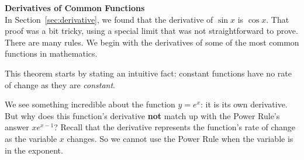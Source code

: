 \noindent\textbf{\large Derivatives of Common Functions}\\

In Section~\ref{sec:derivative}, we found that the derivative of $\sin x$ is $\cos x$.  That proof was a bit tricky, using a special limit that was not straightforward to prove.  There are many rules.  We begin with the derivatives of some of the most common functions in mathematics.\\


This theorem starts by stating an intuitive fact: constant functions have no rate of change as they are \textit{constant}.

We see something incredible about the function $y=e^x$: it is its own derivative.  But why does this function's derivative \textbf{not}
match up with the Power Rule's answer $xe^{x-1}$?  Recall that the derivative represents the function's rate of change as the variable $x$ changes.  So we cannot use the Power Rule when the variable is in the exponent.

